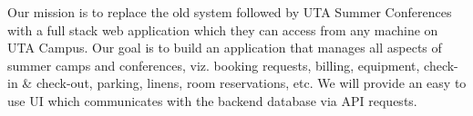 Our mission is to replace the old system followed by UTA Summer Conferences with a full stack web application which they can access from any machine on UTA Campus. Our goal is to build an application that manages all aspects of summer camps and conferences, viz. booking requests, billing, equipment, check-in & check-out, parking, linens, room reservations, etc. We will provide an easy to use UI which communicates with the backend database via API requests.